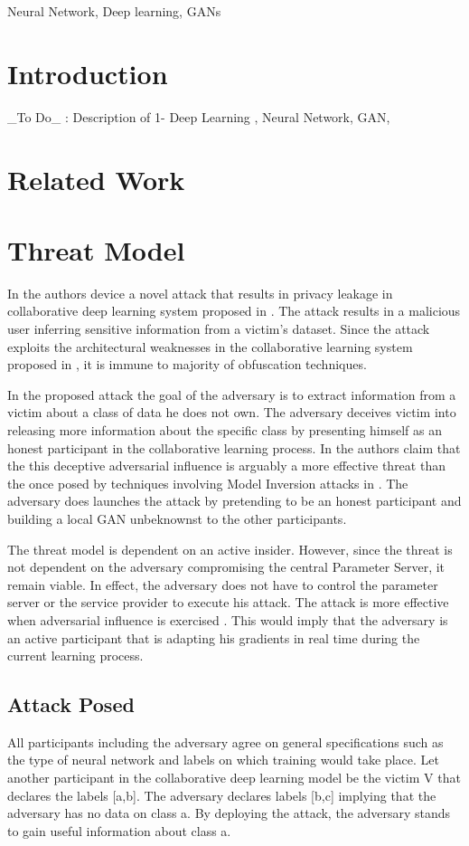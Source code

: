 \documentclass[conference]{IEEEtran}
\begin{document}
\begin{IEEEkeywords}
Neural Network, Deep learning, GANs
\end{IEEEkeywords}

\section{Introduction}
\_To Do\_ : Description of 1- Deep Learning , Neural Network, GAN,

\section{Related Work}

\section{Threat Model}
In \cite{GAN} the authors device a novel attack that results in privacy leakage in collaborative deep learning system proposed in \cite{Shokri}.  The attack results in a malicious user inferring sensitive information from a victim's dataset. Since the attack exploits the architectural weaknesses in the collaborative learning system proposed in \cite{Shokri}, it is immune to majority of obfuscation techniques. 

In the proposed attack the goal of the  adversary is to extract information from a victim about a class of data he does not own. The adversary deceives victim into releasing more information about the specific class by presenting himself as an honest participant in the collaborative learning  process. In \cite{GAN} the authors claim that the this deceptive adversarial influence is arguably a more effective threat than the once posed by techniques involving Model Inversion attacks in \cite{MIA}.  
The adversary does launches the attack by pretending to be an honest participant and building a local GAN unbeknownst to the other participants.

The threat model is dependent on an active insider. However, since the threat is not dependent on the adversary compromising the central Parameter Server, it remain viable. In effect, the adversary does not have to control the parameter server or the service provider to execute his attack.
The attack is more effective when adversarial influence is exercised \cite{GAN}. This would imply that the adversary is an active participant that is adapting his gradients in real time during the current learning process.
\subsection{Attack Posed}
All participants including the adversary agree on general specifications such as the type of neural network and labels on which training would take place. 
Let another participant in the collaborative deep learning model be the victim V that declares the labels [a,b]. The adversary declares labels [b,c] implying that the adversary has no data on class a.
By deploying the attack, the adversary stands to gain useful information about class a.
\end{document}
